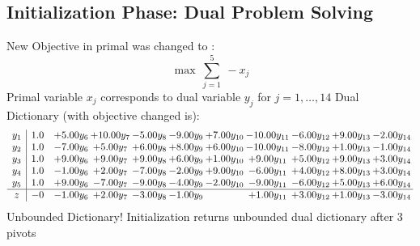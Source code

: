 \documentclass[9pt]{article}
\begin{document}
\subsection{Initialization Phase: Dual Problem Solving}
New Objective in primal was changed to : \[ \max\ \sum_{j=1}^{5}\ - x_j \] 
Primal variable $x_j$ corresponds to dual variable $y_j$ for $j = 1,\ldots,14$
Dual Dictionary (with objective changed is): 
\[\begin{array}{c| c c@{\hskip 2pt} c@{\hskip 2pt} c@{\hskip 2pt} c@{\hskip 2pt} c@{\hskip 2pt} c@{\hskip 2pt} c@{\hskip 2pt} c@{\hskip 2pt} c@{\hskip 2pt} }
 y_{1}   &  1.0 & +  5.00 y_{6} & + 10.00 y_{7} & -5.00 y_{8} & -9.00 y_{9} & +  7.00 y_{10} & -10.00 y_{11} & -6.00 y_{12} & +  9.00 y_{13} & -2.00 y_{14}\\
 y_{2}   &  1.0 & -7.00 y_{6} & +  5.00 y_{7} & +  6.00 y_{8} & +  8.00 y_{9} & +  6.00 y_{10} & -10.00 y_{11} & -8.00 y_{12} & +  1.00 y_{13} & -1.00 y_{14}\\
 y_{3}   &  1.0 & +  9.00 y_{6} & +  9.00 y_{7} & +  9.00 y_{8} & +  6.00 y_{9} & +  1.00 y_{10} & +  9.00 y_{11} & +  5.00 y_{12} & +  9.00 y_{13} & +  3.00 y_{14}\\
 y_{4}   &  1.0 & -1.00 y_{6} & +  2.00 y_{7} & -7.00 y_{8} & -2.00 y_{9} & +  9.00 y_{10} & -6.00 y_{11} & +  4.00 y_{12} & +  8.00 y_{13} & +  3.00 y_{14}\\
 y_{5}   &  1.0 & +  9.00 y_{6} & -7.00 y_{7} & -9.00 y_{8} & -4.00 y_{9} & -2.00 y_{10} & -9.00 y_{11} & -6.00 y_{12} & +  5.00 y_{13} & +  6.00 y_{14}\\
\hline
z    &  -0 & -1.00 y_{6} & +  2.00 y_{7} & -3.00 y_{8} & -1.00 y_{9} &   & +  1.00 y_{11} & +  3.00 y_{12} & +  1.00 y_{13} & -3.00 y_{14}\\
\end{array}\]
Unbounded Dictionary!
Initialization returns unbounded dual dictionary after 3 pivots
\end{document}
